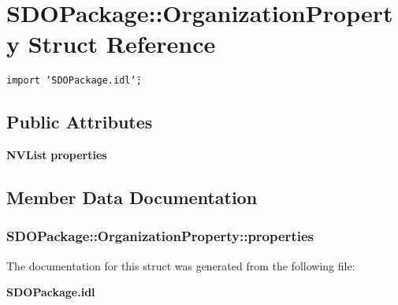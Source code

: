 \section{SDOPackage::Organization\-Property Struct Reference}
\label{structSDOPackage_1_1OrganizationProperty}
{\tt import \char`\"{}SDOPackage.idl\char`\"{};}

\subsection*{Public Attributes}
\begin{CompactItemize}
\item 
{\bf NVList} {\bf properties}
\end{CompactItemize}


\subsection{Member Data Documentation}
\subsubsection{ {\bf SDOPackage::Organization\-Property::properties}}\label{structSDOPackage_1_1OrganizationProperty_SDOPackage_1_1OrganizationPropertyo0}




The documentation for this struct was generated from the following file:\begin{CompactItemize}
\item 
{\bf SDOPackage.idl}\end{CompactItemize}
